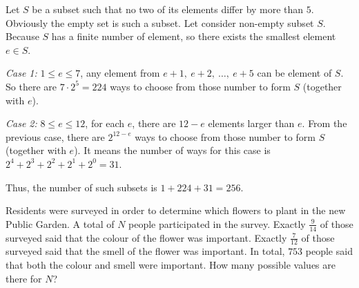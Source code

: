 \documentclass{article}
\begin{document}
\begin{soln}
    Let $S$ be a subset such that no two of its elements differ by more than $5$.
    Obviously the empty set is such a subset.
    Let consider non-empty subset $S$. Because $S$ has a finite number of element, so there exists 
    the smallest element $e \in S$.

    \textit{Case 1:} $1 \le e \le 7$, any element from $e+1,\ e+2,\ \ldots,\ e+5$ can be element of $S$.
    So there are $7\cdot 2^5=224$ ways to choose from those number to form $S$ (together with $e$).

    \textit{Case 2:} $8\le e \le 12$, for each $e$, there are $12-e$ elements larger than $e$.
    From the previous case, there are $2^{12-e}$ ways to choose from those number to form $S$ (together with $e$).
    It means the number of ways for this case is $2^4+2^3+2^2+2^1+2^0=31.$

    Thus, the number of such subsets is $1+224+31=\boxed{256.}$
\end{soln}

\begin{example}
    Residents were surveyed in order to determine which flowers to plant in the new Public Garden.
    A total of $N$ people participated in the survey.
    Exactly $\frac{9}{14}$ of those surveyed said that the colour of the flower was important.
    Exactly $\frac{7}{12}$ of those surveyed said that the smell of the flower was important.
    In total, $753$ people said that both the colour and smell were important.
    How many possible values are there for $N$?
\end{example}
\end{document}

